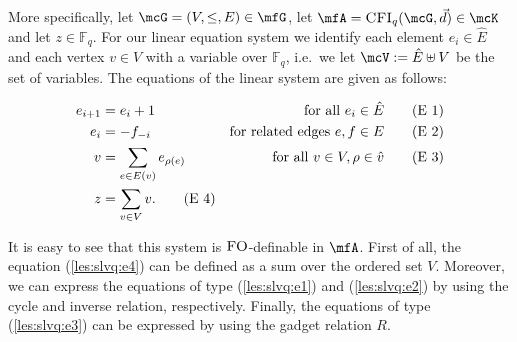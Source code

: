 \documentclass[a4paper,UKenglish]{lipics}
\newcommand{\defeq}{:=}
\newcommand{\field}[1]{\mathbb{#1}}
\newcommand{\logic}[1]{\ensuremath{\textsc{#1}}\xspace}
\newcommand{\FO}{\logic{FO}}
\theoremstyle{plain}
\newcommand{\eqcount}{\ensuremath{
\stepcounter{equation}
\tag{E \theequation}
}
}
\newcommand{\eqcountreset}
{
\setcounter{equation}{0}
}
\begin{document}
More specifically, let $\mcG = (V, \leq, E) \in \mfG$, let $\mfA = 
\CFI(\mcG, \vec d) \in \mcK$ and let $z \in \field F_q$. 
For our linear equation system we identify each element $e_i \in \hat{E}$ 
and each vertex $v \in V$ with a variable over $\field F_q$, i.e.\ we let 
$\mcV \defeq \hat{E} \uplus V$ be the set of variables.
The equations of the linear system are given as follows:

\eqcountreset
\begin{align}
 e_{i+1} &= e_i +1 \quad&\text{for all } e_i \in \hat E \eqcount
 \label{les:slvq:e1}\\
 e_{i} &= - f_{-i} \quad&\text{for related edges } e,f \in E 
\eqcount
\label{les:slvq:e2}
\\
 v &= \sum_{e \in E(v)} e_{\rho(e)} \quad&\text{for all } v \in V, \rho 
\in \hat v \eqcount
\label{les:slvq:e3}
\\
 z &= \sum_{v \in V} v.
 \label{les:slvq:e4}
 \eqcount
\end{align}


It is easy to see that this system is $\FO$-definable in $\mfA$. 
First of all, the equation (\ref{les:slvq:e4}) can be defined as a sum over the 
ordered set $V$. Moreover, we can 
express the equations of type (\ref{les:slvq:e1}) and (\ref{les:slvq:e2}) by 
using the cycle and inverse relation, respectively. 
Finally, the equations of type (\ref{les:slvq:e3}) can be expressed by using 
the gadget relation $R$. 
\end{document}
